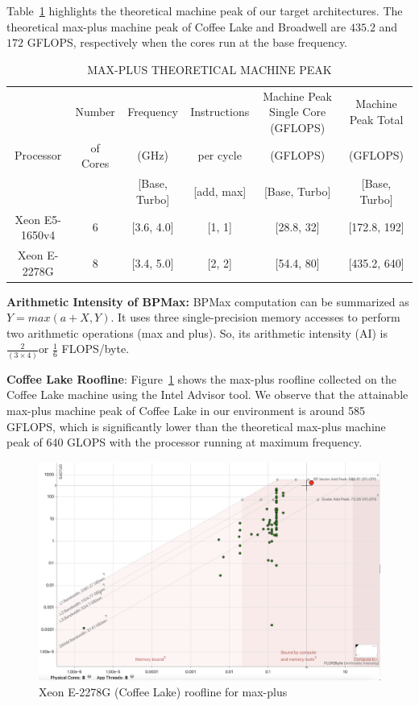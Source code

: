 Table~\ref{tab1:Theoretical_machine_peak} highlights the theoretical machine peak of our target architectures. The theoretical max-plus machine peak of Coffee Lake and Broadwell are $435.2$ and $172$ GFLOPS, respectively when the cores run at the base frequency.

\begin{table}[htbp]
\caption{\uppercase{Max-plus Theoretical Machine Peak}}
\label{tab1:Theoretical_machine_peak}
\begin{center}
\begin{tabular}{|c|c|c|c|c|c|}
\hline
 & Number &  Frequency &  Instructions & Machine Peak Single Core (GFLOPS)& Machine Peak Total\\
 Processor & of Cores& (GHz)  & per cycle & (GFLOPS) & (GFLOPS)\\
  & &  [Base, Turbo] & [add, max]  & [Base, Turbo] & [Base, Turbo]\\
\hline
Xeon E5-1650v4 & 6 & [3.6, 4.0] & [1, 1] & [28.8, 32] & [172.8, 192] \\
\hline
Xeon E-2278G & 8 & [3.4, 5.0] & [2, 2] & [54.4, 80] & [435.2, 640] \\
\hline
\end{tabular}
\end{center}
\end{table}


\textbf{Arithmetic Intensity of BPMax:} BPMax computation can be summarized as $ Y = max(a + X, Y)$.  It uses three single-precision memory accesses to perform two arithmetic operations (max and plus). So, its arithmetic intensity (AI) is $\frac{2}{(3\times4)}$or $\frac{1}{6}$ FLOPS/byte.

\textbf{Coffee Lake Roofline}: Figure~\ref{fig:roof_line_coffee_lake} shows the max-plus roofline collected on the Coffee Lake machine using the Intel Advisor tool. We observe that the attainable max-plus machine peak of Coffee Lake in our environment is around 585 GFLOPS, which is significantly lower than the theoretical max-plus machine peak of 640 GLOPS with the processor running at maximum frequency.

\begin{figure}[htbp]
\centerline{\includegraphics[scale=0.20, trim=0 0 0 0,clip]{content/figures/roofline_coffee_lake.png}}
\caption{Xeon E-2278G (Coffee Lake) roofline for max-plus}
\label{fig:roof_line_coffee_lake}
\end{figure}


